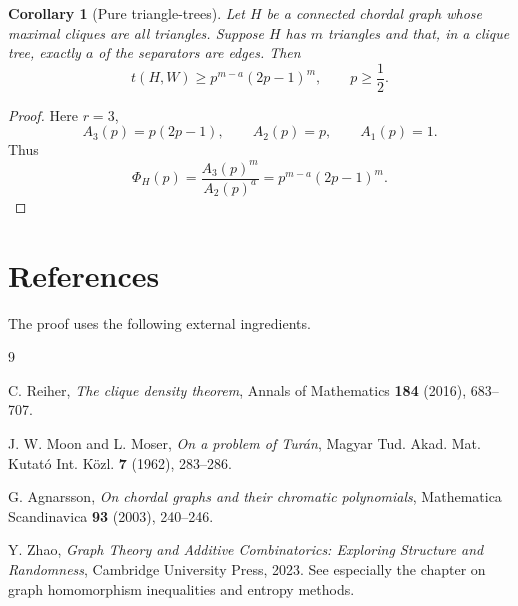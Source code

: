 \documentclass[11pt]{article}
\newtheorem{corollary}{Corollary}
\begin{document}
\begin{corollary}[Pure triangle-trees]
Let \(H\) be a connected chordal graph whose maximal cliques are all triangles.
Suppose \(H\) has \(m\) triangles and that, in a clique tree, exactly \(a\) of the
separators are edges. Then
\[
t(H,W)
\ge
p^{m-a}(2p-1)^m,
\qquad p\ge \frac12.
\]
\end{corollary}

\begin{proof}
Here \(r=3\),
\[
A_3(p)=p(2p-1),
\qquad
A_2(p)=p,
\qquad
A_1(p)=1.
\]
Thus
\[
\Phi_H(p)
=
\frac{A_3(p)^m}{A_2(p)^a}
=
p^{m-a}(2p-1)^m.
\]
\end{proof}

\section{References}

The proof uses the following external ingredients.

\begin{thebibliography}{9}

C. Reiher,
\emph{The clique density theorem},
Annals of Mathematics \textbf{184} (2016), 683--707.

J. W. Moon and L. Moser,
\emph{On a problem of Turán},
Magyar Tud. Akad. Mat. Kutató Int. Közl. \textbf{7} (1962), 283--286.

G. Agnarsson,
\emph{On chordal graphs and their chromatic polynomials},
Mathematica Scandinavica \textbf{93} (2003), 240--246.

Y. Zhao,
\emph{Graph Theory and Additive Combinatorics: Exploring Structure and Randomness},
Cambridge University Press, 2023.
See especially the chapter on graph homomorphism inequalities and entropy methods.

\end{thebibliography}
\end{document}
